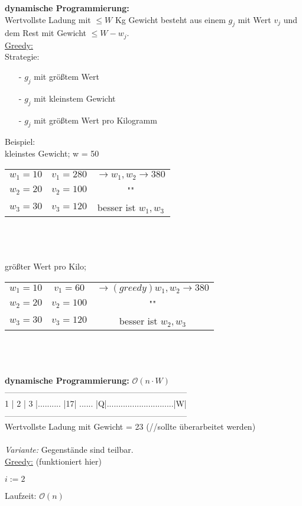 \textbf{dynamische Programmierung:}\\
Wertvollste Ladung mit $\leq W$ Kg Gewicht besteht aus einem $g_j$ mit Wert $v_j$ und dem Rest mit Gewicht $\leq W - w_j$.\\
\underline{Greedy:}\\
Strategie: 
\begin{itemize}
	\item[-] $g_j$ mit größtem Wert
 	\item[-] $g_j$ mit kleinstem Gewicht
 	\item[-] $g_j$ mit größtem Wert pro Kilogramm
\end{itemize}
Beispiel:\\
kleinstes Gewicht; w = 50\\
\begin{tabular}{c c c}
$w_1 = 10$ & $v_1 = 280$ & $\rightarrow w_1, w_2 \rightarrow 380$ \\
$w_2 = 20$ & $v_2 = 100$ & ""\\
$w_3 = 30$ & $v_3 = 120$ & besser ist $w_1, w_3$\\
\end{tabular}
\\
\\
\\
größter Wert pro Kilo;\\
\begin{tabular}{c c c}
$w_1 = 10$ & $v_1 = 60$ & $\rightarrow (greedy) w_1, w_2 \rightarrow 380$ \\
$w_2 = 20$ & $v_2 = 100$ & ""\\
$w_3 = 30$ & $v_3 = 120$ & besser ist $w_2, w_3$\\
\end{tabular}
\\
\\
\\
\textbf{dynamische Programmierung:} $\mathcal O(n \cdot W)$\\
------------------------------------------------------------------\\
1 | 2 | 3 |.......... |17| ...... |Q|.............................|W|\\
------------------------------------------------------------------\\
 Wertvollste Ladung mit Gewicht = 23
(//sollte überarbeitet werden)\\
\\
\emph{Variante:} Gegenstände sind teilbar.\\
\underline{Greedy:} (funktioniert hier) \\

\begin{algorithmic}
\State $i := 2$
\EndWhile
{}
\end{algorithmic}
Laufzeit: $\mathcal O (n)$
